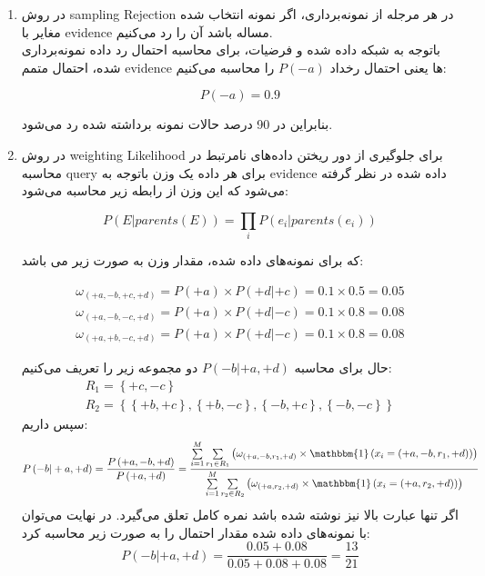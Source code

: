 \begin{enumerate} [label=(\alph*)]
	\item
	در روش sampling Rejection در هر مرجله از نمونه‌برداری، اگر نمونه انتخاب شده مغایر با evidence مساله باشد آن را رد می‌کنیم.\\
	باتوجه به شبکه داده شده و فرضیات، برای محاسبه احتمال رد داده نمونه‌برداری شده، احتمال متمم evidence ها یعنی احتمال رخداد $P\left( { - a} \right)$ را محاسبه می‌کنیم:
	
	$$
	P\left( { - a} \right) = 0.9
	$$
	
	بنابراین در 90 درصد حالات نمونه برداشته شده رد می‌شود.
	
	\item
	در روش weighting Likelihood برای جلوگیری از دور ریختن داده‌های نامرتبط در محاسبه query برای هر داده یک وزن باتوجه به evidence داده شده در نظر گرفته می‌شود که این وزن از رابطه زیر محاسبه می‌شود:
	
	$$
	P(E|parents(E)) = \prod\limits_i {P({e_i}|parents({e_i}))} 
	$$
	
	که برای نمونه‌های داده شده، مقدار وزن به صورت زیر می باشد:
	
	$$
	\begin{array}{l}
		{\omega _{( + a, - b, + c, + d)}} = P( + a) \times P( + d| + c) = 0.1 \times 0.5 = 0.05\\
		{\omega _{( + a, - b, - c, + d)}} = P( + a) \times P( + d| - c) = 0.1 \times 0.8 = 0.08\\
		{\omega _{( + a, + b, - c, + d)}} = P( + a) \times P( + d| - c) = 0.1 \times 0.8 = 0.08
	\end{array}
	$$
	
	حال برای محاسبه $P\left( { - b| + a, + d} \right)$ دو مجموعه زیر را تعریف می‌کنیم:
	$$
	\begin{array}{l}
		{R_1} = \left\{ { + c, - c} \right\}\\
		{R_2} = \left\{ {\left\{ { + b, + c} \right\},\left\{ { + b, - c} \right\},\left\{ { - b, + c} \right\},\left\{ { - b, - c} \right\}} \right\}
	\end{array}
	$$
	سپس داریم:
	$$
	P\left( { - b| + a, + d} \right) = \frac{{P\left( { + a, - b, + d} \right)}}{{P\left( { + a, + d} \right)}} = \frac{{\sum\limits_{i = 1}^M {\sum\limits_{{r_1} \in {R_1}} {\left( {{\omega _{( + a, - b,{r_1}, + d)}} \times \mathbbm{1}\left( {{x_i} = \left( { + a, - b,{r_1}, + d} \right)} \right)} \right)} } }}{{\sum\limits_{i = 1}^M {\sum\limits_{{r_2} \in {R_2}} {\left( {{\omega _{( + a,{r_2}, + d)}} \times \mathbbm{1}\left( {{x_i} = \left( { + a,{r_2}, + d} \right)} \right)} \right)} } }}
	$$
	اگر تنها عبارت بالا نیز نوشته شده باشد نمره کامل تعلق می‌گیرد. در نهایت می‌توان با نمونه‌های داده شده مقدار احتمال را به صورت زیر محاسبه کرد:
	$$
	P\left( { - b| + a, + d} \right) = \frac{{0.05 + 0.08}}{{0.05 + 0.08 + 0.08}} = \frac{{13}}{{21}}
	$$
	

\end{enumerate}
